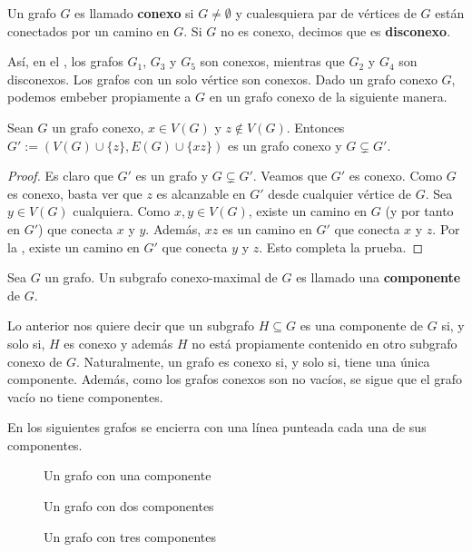 \begin{Def}
   Un grafo $G$ es llamado \textbf{conexo} si $G\neq \emptyset$ y cualesquiera par de vértices  de $G$ están conectados por un camino en $G$. Si $G$ no es conexo, decimos que es \textbf{disconexo}. 
\end{Def}
Así, en el , los grafos $G_1$, $G_3$ y $G_5$ son conexos, mientras que $G_2$ y $G_4$ son disconexos. Los grafos con un solo vértice son conexos. Dado un grafo conexo $G$, podemos embeber propiamente a $G$ en un grafo conexo de la siguiente manera.
\begin{Prop}\label{Prop:Conexo+1}
   Sean $G$ un grafo conexo, $x\in V(G)$ y $z\notin V(G)$. Entonces $G':=(V(G)\cup \{z\}, E(G)\cup \{xz\})$ es un grafo conexo y $G\subsetneq G'$. 
\end{Prop}
\begin{proof}
   Es claro que $G'$ es un grafo y $G\subsetneq G'$. Veamos que $G'$ es conexo. Como $G$ es conexo, basta ver que $z$ es alcanzable en $G'$ desde cualquier vértice de $G$. Sea $y\in V(G)$ cualquiera. Como $x,y\in V(G)$, existe un camino en $G$ (y por tanto en $G'$) que conecta $x$ y $y$. Además, $xz$ es un camino en $G'$ que conecta $x$ y $z$. Por la , existe un camino en $G'$ que conecta $y$ y $z$. Esto completa la prueba.
\end{proof}
\begin{Def}
   Sea $G$ un grafo. Un subgrafo conexo-maximal de $G$ es llamado una \textbf{componente} de $G$. 
\end{Def}
Lo anterior nos quiere decir que un subgrafo $H\subseteq G$ es una componente de $G$ si, y solo si, $H$ es conexo y además $H$ no está propiamente contenido en otro subgrafo conexo de $G$. Naturalmente, un grafo es conexo si, y solo si, tiene una única componente. Además, como los grafos conexos son no vacíos, se sigue que el grafo vacío no tiene componentes.
\begin{Ejm}
   En los siguientes grafos se encierra con una línea punteada cada una de sus componentes.
   \begin{figure}[H]
     \centering
       \resizebox{0.45\textwidth}{!}{}
     \caption{Un grafo con una componente}
   \end{figure}
   \begin{figure}[H]
     \centering
       \resizebox{0.35\textwidth}{!}{}
     \caption{Un grafo con dos componentes}
   \end{figure}
   \begin{figure}[H]
     \centering
       \resizebox{0.55\textwidth}{!}{}
     \caption{Un grafo con tres componentes}
   \end{figure}
\end{Ejm}
